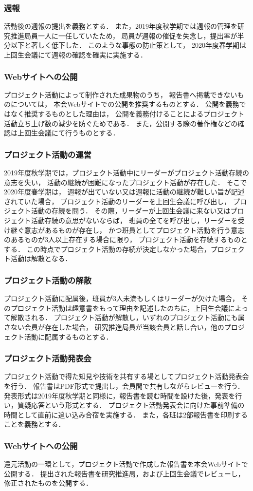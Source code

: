 \subsubsection*{週報}
活動後の週報の提出を義務とする．
また，2019年度秋学期では週報の管理を研究推進局員一人に一任していたため，
局員が週報の催促を失念し，提出率が半分以下と著しく低下した．
このような事態の防止策として，
2020年度春学期は上回生会議にて週報の確認を確実に実施する．

\subsubsection*{Webサイトへの公開}
プロジェクト活動によって制作された成果物のうち，
報告書へ掲載できないものについては，
本会Webサイトでの公開を推奨するものとする．
公開を義務ではなく推奨するものとした理由は，
公開を義務付けることによるプロジェクト活動立ち上げ数の減少を防ぐためである．
また，公開する際の著作権などの確認は上回生会議にて行うものとする．


\subsubsection*{プロジェクト活動の運営}
2019年度秋学期では，プロジェクト活動中にリーダーがプロジェクト活動存続の意志を失い，
活動の継続が困難になったプロジェクト活動が存在した．
そこで2020年度春学期は，
週報が出ていない又は週報に活動の継続が難しい旨が記述されていた場合，
プロジェクト活動のリーダーを上回生会議に呼び出し，
プロジェクト活動の存続を問う．
その際，リーダーが上回生会議に来ない又はプロジェクト活動存続の意思がないならば，
班員の全てを呼び出し，リーダーを受け継ぐ意志があるものが存在し，
かつ班員としてプロジェクト活動を行う意志のあるものが3人以上存在する場合に限り，
プロジェクト活動を存続するものとする．
この時点でプロジェクト活動の存続が決定しなかった場合，プロジェクト活動は解散となる．

\subsubsection*{プロジェクト活動の解散}
プロジェクト活動に配属後，班員が3人未満もしくはリーダーが欠けた場合，
そのプロジェクト活動は趣意書をもって理由を記述したのちに，上回生会議によって解散される．
プロジェクト活動が解散し，いずれのプロジェクト活動にも属さない会員が存在した場合，
研究推進局員が当該会員と話し合い，他のプロジェクト活動に配属するものとする．

\subsubsection*{プロジェクト活動発表会}
プロジェクト活動で得た知見や技術を共有する場としてプロジェクト活動発表会を行う．
報告書はPDF形式で提出し，会員間で共有しながらレビューを行う．
発表形式は2019年度秋学期と同様に，報告書を読む時間を設けた後，発表を行い，質疑応答という形式とする．
プロジェクト活動発表会に向けた事前準備の時間として直前に追い込み合宿を実施する．
また，各班は2部報告書を印刷することを義務とする．

\subsubsection*{Webサイトへの公開}
還元活動の一環として，プロジェクト活動で作成した報告書を本会Webサイトで公開する．
提出された報告書を研究推進局，および上回生会議でレビューし，修正されたものを公開する．
